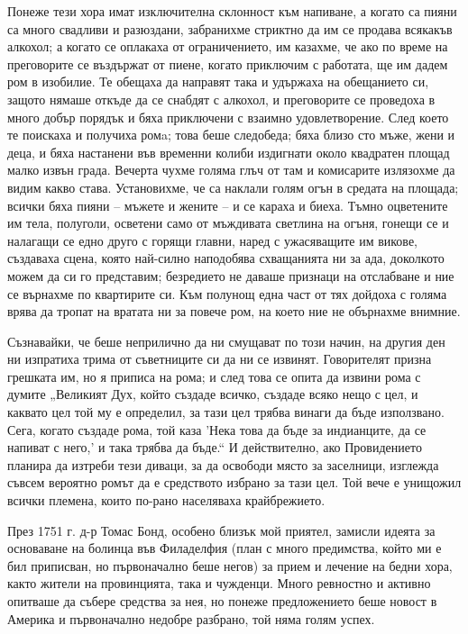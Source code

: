 \documentclass[12pt]{book}
\begin{document}
Понеже тези хора имат изключителна склонност към напиване, а когато са пияни са много свадливи и разюздани, забранихме стриктно да им се продава всякакъв алкохол; а когато се оплакаха от ограничението, им казахме, че ако по време на преговорите се въздържат от пиене, когато приключим с работата, ще им дадем ром в изобилие. Те обещаха да направят така и удържаха на обещанието си, защото нямаше откъде да се снабдят с алкохол, и преговорите се проведоха в много добър порядък и бяха приключени с взаимно удовлетворение. След което те поискаха и получиха ромa; това беше следобеда; бяха близо сто мъже, жени и деца, и бяха настанени във временни колиби издигнати около квадратен площад малко извън града. Вечерта чухме голяма глъч от там и комисарите излязохме да видим какво става. Установихме, че са наклали голям огън в средата на площада; всички бяха пияни – мъжете и жените – и се караха и биеха. Тъмно оцветените им тела, полуголи, осветени само от мъждивата светлина на огъня, гонещи се и налагащи се едно друго с горящи главни, наред с ужасяващите им викове, създаваха сцена, която най-силно наподобява схващанията ни за ада, доколкото можем да си го представим; безредието не даваше признаци на отслабване и ние се върнахме по квартирите си. Към полунощ една част от тях дойдоха  с голяма врява да тропат на вратата ни за повече ром, на което ние не обърнахме внимние. 

Съзнавайки, че беше неприлично да ни смущават по този начин, на другия ден ни изпратиха трима от съветниците си да ни се извинят. Говорителят призна грешката им, но я приписа на рома; и след това се опита да извини рома с думите „Великият Дух, който създаде всичко, създаде всяко нещо с цел, и каквато цел той му е определил, за тази цел трябва винаги да бъде използвано. Сега, когато създаде рома, той каза 'Нека това да бъде за индианците, да се напиват с него,' и така трябва да бъде.“ И действително, ако Провидението планира да изтреби тези диваци, за да освободи място за заселници, изглежда съвсем вероятно ромът да е средството избрано за тази цел. Той вече е унищожил всички племена, които по-рано населяваха крайбрежието.

През 1751 г. д-р Томас Бонд, особено близък мой приятел, замисли идеята за основаване на болинца във Филаделфия (план с много предимства, който ми е бил приписван, но първоначално беше негов) за прием и лечение на бедни хора, както жители на провинцията, така и чужденци. Много ревностно и активно опитваше да събере средства за нея, но понеже предложението беше новост в Америка и първоначално недобре разбрано, той няма голям успех. 
\end{document}
